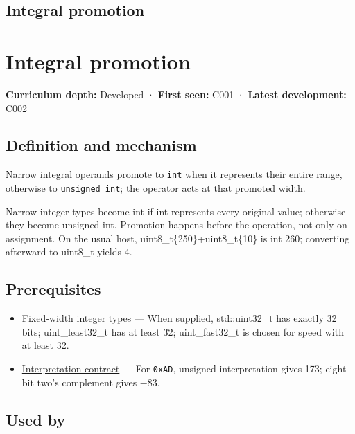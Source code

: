 \hypertarget{appendix-45303d03796a}{}
\section*{Integral promotion}
\chapter{Integral promotion}\label{appendix-45303d03796a-integral-promotion}

\textbf{Curriculum depth:} Developed · \textbf{First seen:} C001 · \textbf{Latest development:} C002

\section{Definition and mechanism}\label{appendix-45303d03796a-definition-and-mechanism}

Narrow integral operands promote to \texttt{int} when it represents their entire range, otherwise to \texttt{unsigned\ int}; the operator acts at that promoted width.

Narrow integer types become int if int represents every original value; otherwise they become unsigned int. Promotion happens before the operation, not only on assignment. On the usual host, uint8\_t\{250\}+uint8\_t\{10\} is int 260; converting afterward to uint8\_t yields 4.

\section{Prerequisites}\label{appendix-45303d03796a-prerequisites}

\begin{itemize}
\tightlist
\item
  \hyperref[appendix-cc04044b5782]{Fixed-width integer types} --- When supplied, std::uint32\_t has exactly 32 bits; uint\_least32\_t has at least 32; uint\_fast32\_t is chosen for speed with at least 32.
\item
  \hyperref[appendix-f414bd4ed05c]{Interpretation contract} --- For \texttt{0xAD}, unsigned interpretation gives 173; eight-bit two's complement gives −83.
\end{itemize}

\section{Used by}\label{appendix-45303d03796a-used-by}

